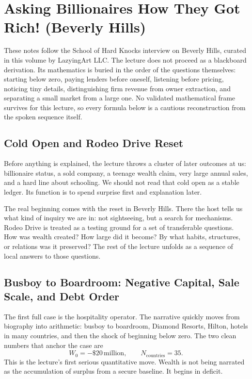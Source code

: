 \chapter{Asking Billionaires How They Got Rich! (Beverly Hills)}

These notes follow the School of Hard Knocks interview on Beverly Hills, curated in this volume by LazyingArt LLC. The lecture does not proceed as a blackboard derivation. Its mathematics is buried in the order of the questions themselves: starting below zero, paying lenders before oneself, listening before pricing, noticing tiny details, distinguishing firm revenue from owner extraction, and separating a small market from a large one. No validated mathematical frame survives for this lecture, so every formula below is a cautious reconstruction from the spoken sequence itself.

\section{Cold Open and Rodeo Drive Reset}

Before anything is explained, the lecture throws a cluster of later outcomes at us: billionaire status, a sold company, a teenage wealth claim, very large annual sales, and a hard line about schooling. We should not read that cold open as a stable ledger. Its function is to spend surprise first and explanation later.

The real beginning comes with the reset in Beverly Hills. There the host tells us what kind of inquiry we are in: not sightseeing, but a search for mechanisms. Rodeo Drive is treated as a testing ground for a set of transferable questions. How was wealth created? How large did it become? By what habits, structures, or relations was it preserved? The rest of the lecture unfolds as a sequence of local answers to those questions.

\section{Busboy to Boardroom: Negative Capital, Sale Scale, and Debt Order}

The first full case is the hospitality operator. The narrative quickly moves from biography into arithmetic: busboy to boardroom, Diamond Resorts, Hilton, hotels in many countries, and then the shock of beginning below zero. The two clean numbers that anchor the case are
\begin{equation}
W_0 = -\$20\,\text{million}, \qquad N_{\text{countries}} = 35.
\end{equation}
This is the lecture's first serious quantitative move. Wealth is not being narrated as the accumulation of surplus from a secure baseline. It begins in deficit.

